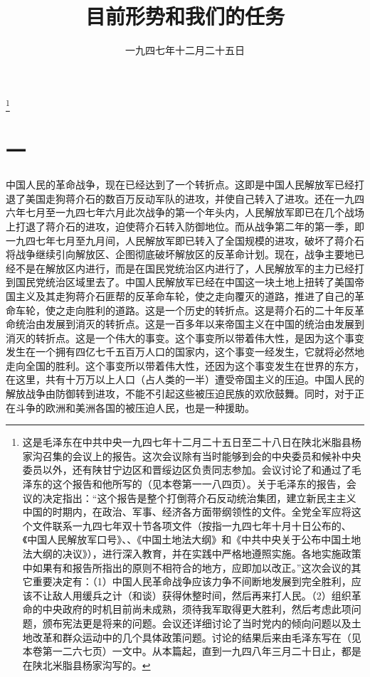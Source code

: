 
\title{目前形势和我们的任务}
\date{一九四七年十二月二十五日}
\thanks{这是毛泽东在中共中央一九四七年十二月二十五日至二十八日在陕北米脂县杨家沟召集的会议上的报告。这次会议除有当时能够到会的中央委员和候补中央委员以外，还有陕甘宁边区和晋绥边区负责同志参加。会议讨论了和通过了毛泽东的这个报告和他所写的（见本卷第一一八四页）。关于毛泽东的报告，会议的决定指出：“这个报告是整个打倒蒋介石反动统治集团，建立新民主主义中国的时期内，在政治、军事、经济各方面带纲领性的文件。全党全军应将这个文件联系一九四七年双十节各项文件（按指一九四七年十月十日公布的、《中国人民解放军口号》、、《中国土地法大纲》和《中共中央关于公布中国土地法大纲的决议》），进行深入教育，并在实践中严格地遵照实施。各地实施政策中如果有和报告所指出的原则不相符合的地方，应即加以改正。”这次会议的其它重要决定有：（1）中国人民革命战争应该力争不间断地发展到完全胜利，应该不让敌人用缓兵之计（和谈）获得休整时间，然后再来打人民。（2）组织革命的中央政府的时机目前尚未成熟，须待我军取得更大胜利，然后考虑此项问题，颁布宪法更是将来的问题。会议还详细讨论了当时党内的倾向问题以及土地改革和群众运动中的几个具体政策问题。讨论的结果后来由毛泽东写在（见本卷第一二六七页）一文中。从本篇起，直到一九四八年三月二十日止，都是在陕北米脂县杨家沟写的。}
\maketitle


\section*{一}

中国人民的革命战争，现在已经达到了一个转折点。这即是中国人民解放军已经打退了美国走狗蒋介石的数百万反动军队的进攻，并使自己转入了进攻。还在一九四六年七月至一九四七年六月此次战争的第一个年头内，人民解放军即已在几个战场上打退了蒋介石的进攻，迫使蒋介石转入防御地位。而从战争第二年的第一季，即一九四七年七月至九月间，人民解放军即已转入了全国规模的进攻，破坏了蒋介石将战争继续引向解放区、企图彻底破坏解放区的反革命计划。现在，战争主要地已经不是在解放区内进行，而是在国民党统治区内进行了，人民解放军的主力已经打到国民党统治区域里去了。中国人民解放军已经在中国这一块土地上扭转了美国帝国主义及其走狗蒋介石匪帮的反革命车轮，使之走向覆灭的道路，推进了自己的革命车轮，使之走向胜利的道路。这是一个历史的转折点。这是蒋介石的二十年反革命统治由发展到消灭的转折点。这是一百多年以来帝国主义在中国的统治由发展到消灭的转折点。这是一个伟大的事变。这个事变所以带着伟大性，是因为这个事变发生在一个拥有四亿七千五百万人口的国家内，这个事变一经发生，它就将必然地走向全国的胜利。这个事变所以带着伟大性，还因为这个事变发生在世界的东方，在这里，共有十万万以上人口（占人类的一半）遭受帝国主义的压迫。中国人民的解放战争由防御转到进攻，不能不引起这些被压迫民族的欢欣鼓舞。同时，对于正在斗争的欧洲和美洲各国的被压迫人民，也是一种援助。

